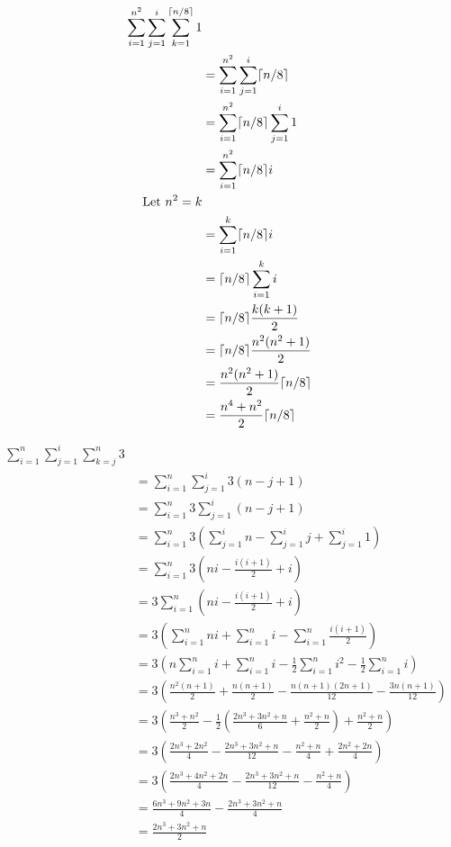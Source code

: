 \documentclass[11pt,largemargins]{homework}
\begin{document}
\begin{alphaparts}
  \questionpart
  \begin{align}
    \sum_{i=1}^{n^2} \sum_{j=1}^{i} \sum_{k=1}^{\ceil*{n / 8}} 1 \\
    &= \sum_{i=1}^{n^2} \sum_{j=1}^{i} \ceil*{n / 8} \\
    &= \sum_{i=1}^{n^2} \ceil*{n / 8} \sum_{j=1}^{i} 1 \\
    &= \sum_{i=1}^{n^2} \ceil*{n / 8} i \\
    \text{Let $n^2 = k$} \\
    &= \sum_{i=1}^{k} \ceil*{n / 8} i \\
    &= \ceil*{n / 8} \sum_{i=1}^{k} i \\
    &= \ceil*{n / 8} \frac{k(k+1)}{2} \\
    &= \ceil*{n / 8} \frac{n^2(n^2+1)}{2} \\
    &= \frac{n^2(n^2+1)}{2} \ceil*{n / 8} \\
    &= \frac{n^4 + n^2}{2} \ceil*{n / 8}
  \end{align}

  \newpage
  \questionpart
  \begin{align}
    \sum_{i=1}^{n} \sum_{j=1}^{i} \sum_{k=j}^{n} 3 \\
    &= \sum_{i=1}^{n} \sum_{j=1}^{i} 3(n-j+1) \\
    &= \sum_{i=1}^{n} 3 \sum_{j=1}^{i} (n-j+1) \\
    &= \sum_{i=1}^{n} 3 (\sum_{j=1}^{i} n - \sum_{j=1}^{i} j + \sum_{j=1}^{i} 1) \\
    &= \sum_{i=1}^{n} 3 (ni - \frac{i(i+1)}{2} + i) \\
    &= 3 \sum_{i=1}^{n} (ni - \frac{i(i+1)}{2} + i) \\
    &= 3 (\sum_{i=1}^{n} ni + \sum_{i=1}^{n} i - \sum_{i=1}^{n} \frac{i(i+1)}{2}) \\
    &= 3 (n \sum_{i=1}^{n} i + \sum_{i=1}^{n} i - \frac{1}{2} \sum_{i=1}^{n} i^2 - \frac{1}{2} \sum_{i=1}^{n} i) \\
    &= 3 (\frac{n^2(n+1)}{2} + \frac{n(n+1)}{2} - \frac{n(n+1)(2n+1)}{12} - \frac{3n(n+1)}{12}) \\
    &= 3(\frac{n^{3}+n^{2}}{2}-\frac{1}{2}(\frac{2n^{3}+3n^{2}+n}{6}+\frac{n^{2}+n}{2})+\frac{n^{2}+n}{2}) \\
    &= 3(\frac{2n^{3}+2n^{2}}{4}-\frac{2n^{3}+3n^{2}+n}{12}-\frac{n^{2}+n}{4}+\frac{2n^{2}+2n}{4}) \\
    &= 3(\frac{2n^{3}+4n^{2}+2n}{4}-\frac{2n^{3}+3n^{2}+n}{12}-\frac{n^{2}+n}{4}) \\
    &= \frac{6n^{3}+9n^{2}+3n}{4}-\frac{2n^{3}+3n^{2}+n}{4} \\
    &= \frac{2n^{3}+3n^{2}+n}{2}
  \end{align}


\end{alphaparts}
\end{document}
